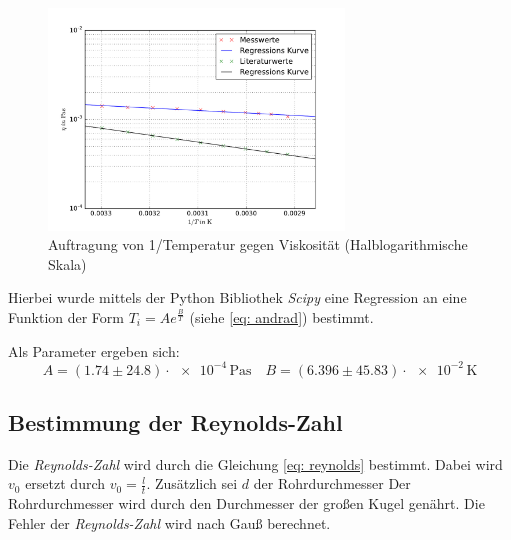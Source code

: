 \begin{figure}
\centering
\includegraphics[width=0.7\textwidth]{pics/viskositaet_temp__log_mit_lit.pdf}
\caption{ Auftragung von 1/Temperatur gegen Viskosität (Halblogarithmische Skala)} %
\label{fig:t_v_l_v}
\end{figure}
\FloatBarrier

Hierbei wurde mittels der Python Bibliothek \emph{Scipy} eine
Regression an eine Funktion der Form $T_i = Ae^{\frac{B}{T}}$ (siehe \eqref{eq: andrad}) bestimmt. %

Als Parameter ergeben sich:
\begin{equation*} %
A=\left(\num{1.74}\pm\num{24.8}\right)\cdot\num{e-4}\,\si{\pascal\second} \quad B=\left(\num{6.396} \pm\num{45.83}\right)\cdot\num{e-2}\,\si{\kelvin} %
\end{equation*}

\subsection{Bestimmung der Reynolds-Zahl}

Die \emph{Reynolds-Zahl} wird durch die Gleichung \eqref{eq: reynolds} bestimmt.
Dabei wird $v_0$ ersetzt durch $v_0=\frac{l}{t}$.
Zusätzlich sei $d$ der Rohrdurchmesser  %
Der Rohrdurchmesser wird durch den Durchmesser der großen Kugel genährt.
Die Fehler der \emph{Reynolds-Zahl} wird nach Gauß berechnet. %


